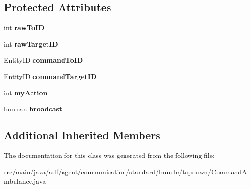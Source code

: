 \subsection*{Protected Attributes}
\begin{DoxyCompactItemize}
\item 
\hypertarget{classadf_1_1agent_1_1communication_1_1standard_1_1bundle_1_1topdown_1_1CommandAmbulance_a31051c1bc32dc12fac65690d9281a1a1}{}\label{classadf_1_1agent_1_1communication_1_1standard_1_1bundle_1_1topdown_1_1CommandAmbulance_a31051c1bc32dc12fac65690d9281a1a1} 
int {\bfseries raw\+To\+ID}
\item 
\hypertarget{classadf_1_1agent_1_1communication_1_1standard_1_1bundle_1_1topdown_1_1CommandAmbulance_ad888a0ed00e9c5cb8a3fbd3b068c8840}{}\label{classadf_1_1agent_1_1communication_1_1standard_1_1bundle_1_1topdown_1_1CommandAmbulance_ad888a0ed00e9c5cb8a3fbd3b068c8840} 
int {\bfseries raw\+Target\+ID}
\item 
\hypertarget{classadf_1_1agent_1_1communication_1_1standard_1_1bundle_1_1topdown_1_1CommandAmbulance_ab1b500c2c036d3f0757960b66a45d347}{}\label{classadf_1_1agent_1_1communication_1_1standard_1_1bundle_1_1topdown_1_1CommandAmbulance_ab1b500c2c036d3f0757960b66a45d347} 
Entity\+ID {\bfseries command\+To\+ID}
\item 
\hypertarget{classadf_1_1agent_1_1communication_1_1standard_1_1bundle_1_1topdown_1_1CommandAmbulance_a7c32b44d41dfcc324f2b96d1003f2561}{}\label{classadf_1_1agent_1_1communication_1_1standard_1_1bundle_1_1topdown_1_1CommandAmbulance_a7c32b44d41dfcc324f2b96d1003f2561} 
Entity\+ID {\bfseries command\+Target\+ID}
\item 
\hypertarget{classadf_1_1agent_1_1communication_1_1standard_1_1bundle_1_1topdown_1_1CommandAmbulance_a833fb26d29b54d06a1161084d3745e26}{}\label{classadf_1_1agent_1_1communication_1_1standard_1_1bundle_1_1topdown_1_1CommandAmbulance_a833fb26d29b54d06a1161084d3745e26} 
int {\bfseries my\+Action}
\item 
\hypertarget{classadf_1_1agent_1_1communication_1_1standard_1_1bundle_1_1topdown_1_1CommandAmbulance_a29b002c5973669bce42d262debc97cb2}{}\label{classadf_1_1agent_1_1communication_1_1standard_1_1bundle_1_1topdown_1_1CommandAmbulance_a29b002c5973669bce42d262debc97cb2} 
boolean {\bfseries broadcast}
\end{DoxyCompactItemize}
\subsection*{Additional Inherited Members}


The documentation for this class was generated from the following file\+:\begin{DoxyCompactItemize}
\item 
src/main/java/adf/agent/communication/standard/bundle/topdown/Command\+Ambulance.\+java\end{DoxyCompactItemize}
